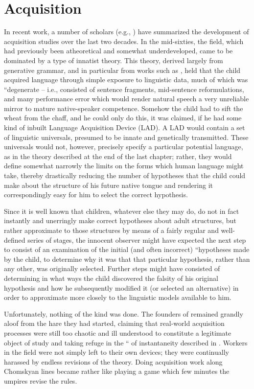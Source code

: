\chapter{Acquisition} \label{ch:3}

In recent work, a number of scholars (e.g., \citealt{Bruner1979,Snow1979}) have summarized the development of acquisition studies over the last two decades. In the mid-sixties, the field, which had previously been atheoretical and somewhat underdeveloped, came to be dominated by a type of innatist theory. This theory, derived largely from generative grammar, and in particular from works such as \citet{Chomsky1962}, held that the child acquired language through simple exposure to linguistic data, much of which was ``degenerate -- i.e., consisted of sentence fragments, mid-sentence reformulations, and many  performance error which would render natural speech a very unreliable mirror to mature native-speaker competence. Somehow the child had to sift the wheat from the chaff, and he could only do this, it was claimed, if he had some kind of inbuilt Language Acquisition Device (LAD). A LAD would contain a set of linguistic universals, presumed to be innate and genetically transmitted. These universals would not, however, precisely specify a particular potential language, as in the theory described at the end of the last chapter; rather, they would define somewhat narrowly the limits on the forms which human language might take, thereby drastically reducing the number of hypotheses that the child could make about the structure of his future native tongue and rendering it correspondingly easy for him to select the correct hypothesis.

Since it is well known that children, whatever else they may do, do not in fact instantly and unerringly make correct hypotheses about adult structures, but rather approximate to those structures by means of a fairly regular and well-defined series of stages, the innocent observer might have expected the next step to consist of an examination of the initial (and often incorrect) ``hypotheses made by the child, to determine why it was that that particular hypothesis, rather than any other, was originally selected. Further steps might have consisted of determining in what ways the child discovered the falsity of his original hypothesis and how he subsequently modified it (or selected an alternative) in order to approximate more closely to the linguistic models available to him.

Unfortunately, nothing of the kind was done. The founders of  remained grandly aloof from the hare they had started, claiming that real-world acquisition processes were still too chaotic and ill understood to constitute a legitimate object of study and taking refuge in the `` of instantaneity described in \cite[Chapter 7]{ChomskyEtAl1968}. Workers in the field were not simply left to their own devices; they were continually harassed by endless revisions of the theory. Doing acquisition work along Chomskyan lines became rather like playing a game which few minutes the umpires revise the rules.

